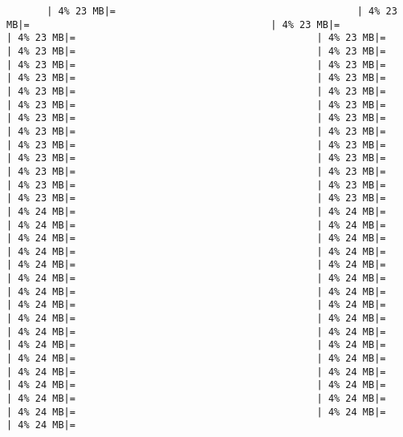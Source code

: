 \documentclass[
]{article}
\begin{document}
\begin{verbatim}
       | 4% 23 MB|=                                          | 4% 23 MB|=                                          | 4% 23 MB|=                                          | 4% 23 MB|=                                          | 4% 23 MB|=                                          | 4% 23 MB|=                                          | 4% 23 MB|=                                          | 4% 23 MB|=                                          | 4% 23 MB|=                                          | 4% 23 MB|=                                          | 4% 23 MB|=                                          | 4% 23 MB|=                                          | 4% 23 MB|=                                          | 4% 23 MB|=                                          | 4% 23 MB|=                                          | 4% 23 MB|=                                          | 4% 23 MB|=                                          | 4% 23 MB|=                                          | 4% 23 MB|=                                          | 4% 23 MB|=                                          | 4% 23 MB|=                                          | 4% 23 MB|=                                          | 4% 23 MB|=                                          | 4% 23 MB|=                                          | 4% 23 MB|=                                          | 4% 23 MB|=                                          | 4% 23 MB|=                                          | 4% 23 MB|=                                          | 4% 23 MB|=                                          | 4% 24 MB|=                                          | 4% 24 MB|=                                          | 4% 24 MB|=                                          | 4% 24 MB|=                                          | 4% 24 MB|=                                          | 4% 24 MB|=                                          | 4% 24 MB|=                                          | 4% 24 MB|=                                          | 4% 24 MB|=                                          | 4% 24 MB|=                                          | 4% 24 MB|=                                          | 4% 24 MB|=                                          | 4% 24 MB|=                                          | 4% 24 MB|=                                          | 4% 24 MB|=                                          | 4% 24 MB|=                                          | 4% 24 MB|=                                          | 4% 24 MB|=                                          | 4% 24 MB|=                                          | 4% 24 MB|=                                          | 4% 24 MB|=                                          | 4% 24 MB|=                                          | 4% 24 MB|=                                          | 4% 24 MB|=                                          | 4% 24 MB|=                                          | 4% 24 MB|=                                          | 4% 24 MB|=                                          | 4% 24 MB|=                                          | 4% 24 MB|=                                          | 4% 24 MB|=                                          | 4% 24 MB|=                                          | 4% 24 MB|=                                          | 4% 24 MB|=      
\end{verbatim}
\end{document}
